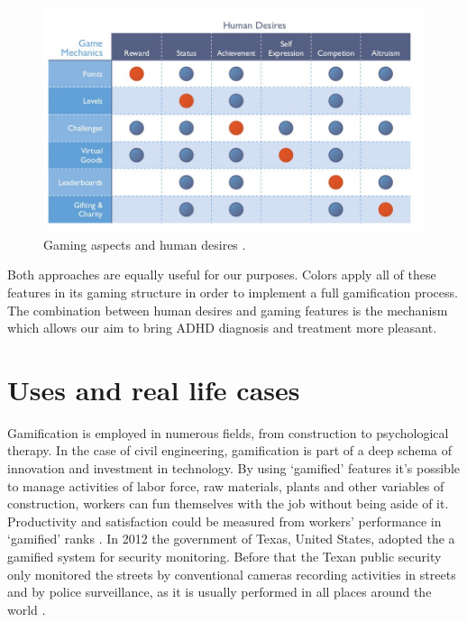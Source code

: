 \begin{figure}[h]
\begin{center}
  \includegraphics[scale=0.5]{chapters/gamification/img/gaming.jpg}
  \caption{Gaming aspects and human desires \citep{Bunchball}.}
  \label{taxonomy_1}
\end{center}
\end{figure}

Both approaches are equally useful for our purposes. Colors apply all of these features in its gaming structure in order to implement a full gamification process. The combination between human desires and gaming features is the mechanism which allows our aim to bring ADHD diagnosis and treatment more pleasant.


\section{Uses and real life cases}

Gamification is employed in numerous fields, from construction to psychological therapy.  In the case of civil engineering, gamification is part of a deep schema of innovation and investment in technology. By using `gamified' features it's possible to manage activities of labor force, raw materials, plants and other variables of construction, workers can fun themselves with the job without being aside of it. Productivity and satisfaction could be measured from workers' performance in `gamified' ranks  \citep{formoso}. In 2012 the government of Texas, United States, adopted the a gamified system for security monitoring. Before that the Texan public security only monitored the streets by conventional cameras recording activities in streets and by police surveillance, as it is usually performed in all places around the world \citep{conf/cts/Aud13}.

